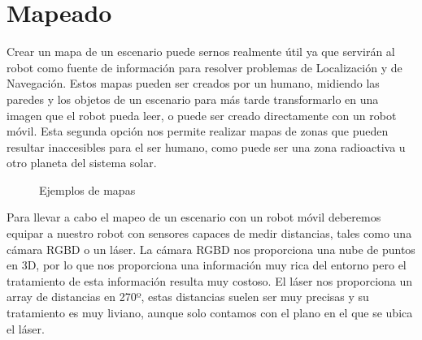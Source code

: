 \section{Mapeado}
\label{cap:mapeado}
Crear un mapa de un escenario puede sernos realmente útil ya que servirán al robot como fuente de información para resolver problemas de Localización y de Navegación. Estos mapas pueden ser creados por un humano, midiendo las paredes y los objetos de un escenario para más tarde transformarlo en una imagen que el robot pueda leer, o puede ser creado directamente con un robot móvil. Esta segunda opción nos permite realizar mapas de zonas que pueden resultar inaccesibles para el ser humano, como puede ser una zona radioactiva u otro planeta del sistema solar.

\begin{figure}[hbtp]
  \begin{center}
  \end{center}
  \caption{Ejemplos de mapas}
  \label{fig:maps-ej}
\end{figure}
Para llevar a cabo el mapeo de un escenario con un robot móvil deberemos equipar a nuestro robot con sensores capaces de medir distancias, tales como una cámara RGBD o un láser. La cámara RGBD nos proporciona una nube de puntos en 3D, por lo que nos proporciona una información muy rica del entorno pero el tratamiento de esta información resulta muy costoso. El láser nos proporciona un array de distancias en 270º, estas distancias suelen ser muy precisas y su tratamiento es muy liviano, aunque solo contamos con el plano en el que se ubica el láser. 

